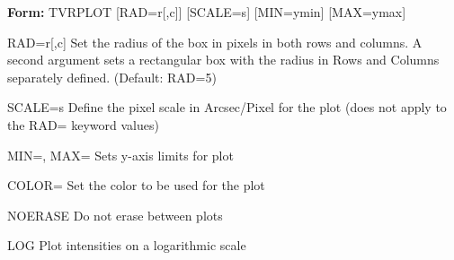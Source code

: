 {\newpage\clearpage
{}%
\begin{command}
  \item[\textbf{Form: } TVRPLOT {[RAD=r{[,c]}]} {[SCALE=s]} {[MIN=ymin]} 
       {[MAX=ymax]}\hfill]{}
  \item[RAD=r{[,c]}]{ Set the radius of the box in pixels in both rows 
       and columns.  A second argument sets a rectangular 
       box with the radius in Rows and Columns separately 
       defined.  (Default: RAD=5)}
  \item[SCALE=s]{   Define the pixel scale in Arcsec/Pixel for the plot
       (does not apply to the RAD= keyword values)}
  \item[MIN=, MAX=]{ Sets y-axis limits for plot}
  \item[COLOR=]{ Set the color to be used for the plot}
  \item[NOERASE]{ Do not erase between plots}
  \item[LOG]{ Plot intensities on a logarithmic scale}
\end{command}%
\lthtmlfigureZ
\lthtmlcheckvsize\clearpage}


